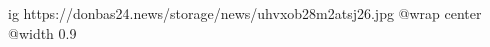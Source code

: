  
 
 
 
 

\ifcmt
  ig https://donbas24.news/storage/news/uhvxob28m2atsj26.jpg
  @wrap center
  @width 0.9
\fi
